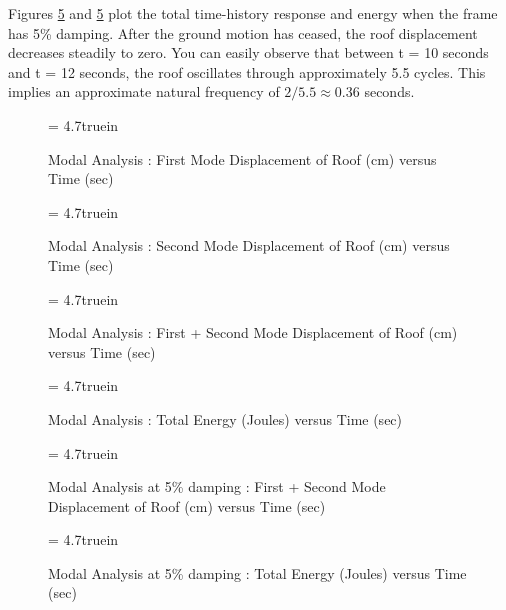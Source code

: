\vspace{0.15 in}
\noindent\hspace{0.50 in}
Figures \ref{fig: bmodal-results-5} and \ref{fig: bmodal-results-5}
plot the total time-history response and energy when the frame has 5\% damping.
After the ground motion has ceased, the roof displacement decreases
steadily to zero. You can easily observe that between t = 10 seconds
and t = 12 seconds, the roof oscillates through approximately 5.5 cycles.
This implies an approximate natural frequency of $2/5.5 \approx 0.36$ seconds. 

\clearpage
\begin{figure}[ht]
\epsfxsize= 4.7truein
\centerline{}
\caption{Modal Analysis : First Mode Displacement of Roof (cm) versus Time (sec)}
\label{fig: bmodal-results-1}
\end{figure}

\begin{figure}[h]
\epsfxsize= 4.7truein
\centerline{}
\caption{Modal Analysis : Second Mode Displacement of Roof (cm) versus Time (sec)}
\label{fig: bmodal-results-2}
\end{figure}

\clearpage
\begin{figure}[ht]
\epsfxsize= 4.7truein
\centerline{}
\caption{Modal Analysis : First + Second Mode Displacement of Roof (cm) versus Time (sec)}
\label{fig: bmodal-results-3}
\end{figure}

\begin{figure}[h]
\epsfxsize= 4.7truein
\centerline{}
\caption{Modal Analysis : Total Energy (Joules) versus Time (sec)}
\label{fig: bmodal-results-4}
\end{figure}

\clearpage
\begin{figure}[ht]
\epsfxsize= 4.7truein
\centerline{}
\caption{Modal Analysis at 5\% damping : First + Second Mode Displacement of Roof (cm) versus Time (sec)}
\label{fig: bmodal-results-5}
\end{figure}

\begin{figure}[h]
\epsfxsize= 4.7truein
\centerline{}
\caption{Modal Analysis at 5\% damping : Total Energy (Joules) versus Time (sec)}
\label{fig: bmodal-results-6}
\end{figure}
